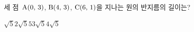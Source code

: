 세 점~$\mathrm{A}(0,\,3)$, $\mathrm{B}(4,\,3)$, $\mathrm{C}(6,\,1)$을 지나는 원의 반지름의 길이는?
\begin{choices32}{$\sqrt{5}$}{$2\sqrt{5}$}{$5$}{$3\sqrt{5}$}{$4\sqrt{5}$}\end{choices32}
